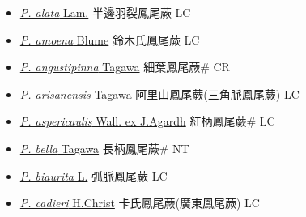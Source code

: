 \begin{itemize}
  \begin{itemize}
        \item[] \href{http://www.theplantlist.org/tpl1.1/search?q=Pteris+alata}{\textit{P. alata} Lam.}   半邊羽裂鳳尾蕨 LC
        \item[] \href{http://www.theplantlist.org/tpl1.1/search?q=Pteris+amoena}{\textit{P. amoena} Blume}     鈴木氏鳳尾蕨 LC
        \item[] \href{http://www.theplantlist.org/tpl1.1/search?q=Pteris+angustipinna}{\textit{P. angustipinna} Tagawa}   細葉鳳尾蕨\# CR
        \item[] \href{http://www.theplantlist.org/tpl1.1/search?q=Pteris+arisanensis}{\textit{P. arisanensis} Tagawa}     阿里山鳳尾蕨(三角脈鳳尾蕨)   LC
        \item[] \href{http://www.theplantlist.org/tpl1.1/search?q=Pteris+aspericaulis}{\textit{P. aspericaulis} Wall. ex J.Agardh}     紅柄鳳尾蕨\# LC
        \item[] \href{http://www.theplantlist.org/tpl1.1/search?q=Pteris+bella}{\textit{P. bella} Tagawa}   長柄鳳尾蕨\# NT
        \item[] \href{http://www.theplantlist.org/tpl1.1/search?q=Pteris+biaurita}{\textit{P. biaurita} L.}   弧脈鳳尾蕨 LC
        \item[] \href{http://www.theplantlist.org/tpl1.1/search?q=Pteris+cadieri}{\textit{P. cadieri} H.Christ}     卡氏鳳尾蕨(廣東鳳尾蕨)   LC

\end{itemize}
\end{itemize}
